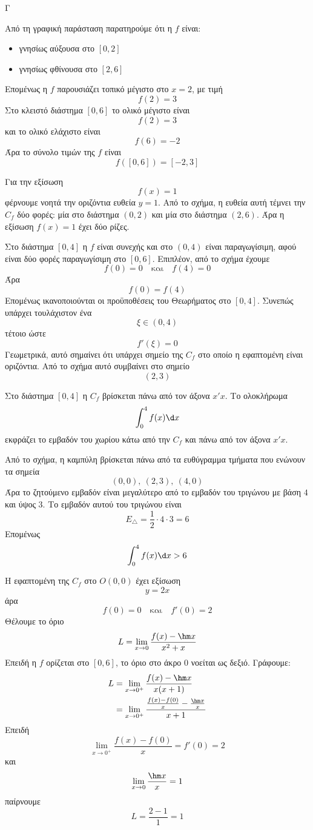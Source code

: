 \begin{thema}{Γ}
\begin{erwthma}
\item Από τη γραφική παράσταση παρατηρούμε ότι η $f$ είναι:
\begin{itemize}
\item γνησίως αύξουσα στο $[0,2]$
\item γνησίως φθίνουσα στο $[2,6]$
\end{itemize}
Επομένως η $f$ παρουσιάζει τοπικό μέγιστο στο $x=2$, με τιμή
\[
f(2)=3
\]
Στο κλειστό διάστημα $[0,6]$ το ολικό μέγιστο είναι
\[
f(2)=3
\]
και το ολικό ελάχιστο είναι
\[
f(6)=-2
\]
Άρα το σύνολο τιμών της $f$ είναι
\[
f([0,6])=[-2,3]
\]

Για την εξίσωση
\[
f(x)=1
\]
φέρνουμε νοητά την οριζόντια ευθεία $y=1$.
Από το σχήμα, η ευθεία αυτή τέμνει την $C_f$ δύο φορές: μία στο διάστημα $(0,2)$ και μία στο διάστημα $(2,6)$.
Άρα η εξίσωση $f(x)=1$ έχει δύο ρίζες.

\item Στο διάστημα $[0,4]$ η $f$ είναι συνεχής και στο $(0,4)$ είναι παραγωγίσιμη, αφού είναι δύο φορές παραγωγίσιμη στο $[0,6]$.
Επιπλέον, από το σχήμα έχουμε
\[
f(0)=0
\quad \text{και}\quad
f(4)=0
\]
Άρα
\[
f(0)=f(4)
\]
Επομένως ικανοποιούνται οι προϋποθέσεις του Θεωρήματος  στο $[0,4]$.
Συνεπώς υπάρχει τουλάχιστον ένα
\[
\xi\in(0,4)
\]
τέτοιο ώστε
\[
f'(\xi)=0
\]
Γεωμετρικά, αυτό σημαίνει ότι υπάρχει σημείο της $C_f$ στο οποίο η εφαπτομένη είναι οριζόντια.
Από το σχήμα αυτό συμβαίνει στο σημείο
\[
(2,3)
\]

\item Στο διάστημα $[0,4]$ η $C_f$ βρίσκεται πάνω από τον άξονα $x'x$.
Το ολοκλήρωμα
\[
\dint_0^4 f(x)\d x
\]
εκφράζει το εμβαδόν του χωρίου κάτω από την $C_f$ και πάνω από τον άξονα $x'x$.

Από το σχήμα, η καμπύλη βρίσκεται πάνω από τα ευθύγραμμα τμήματα που ενώνουν τα σημεία
\[
(0,0),\ (2,3),\ (4,0)
\]
Άρα το ζητούμενο εμβαδόν είναι μεγαλύτερο από το εμβαδόν του τριγώνου με βάση $4$ και ύψος $3$.
Το εμβαδόν αυτού του τριγώνου είναι
\[
E_{\triangle}=\frac{1}{2}\cdot 4\cdot 3=6
\]
Επομένως
\[
\dint_0^4 f(x)\d x>6
\]

\item Η εφαπτομένη της $C_f$ στο $O(0,0)$ έχει εξίσωση
\[
y=2x
\]
άρα
\[
f(0)=0
\quad \text{και}\quad
f'(0)=2
\]
Θέλουμε το όριο
\[
L=\lim\limits_{x\to 0}\frac{f(x)-\hm x}{x^2+x}
\]
Επειδή η $f$ ορίζεται στο $[0,6]$, το όριο στο άκρο $0$ νοείται ως δεξιό.
Γράφουμε:
\begin{align*}
L
&=\lim\limits_{x\to 0^+}\frac{f(x)-\hm x}{x(x+1)}\\
&=\lim\limits_{x\to 0^+}\frac{\frac{f(x)-f(0)}{x}-\frac{\hm x}{x}}{x+1}
\end{align*}
Επειδή
\[
\lim\limits_{x\to 0^+}\frac{f(x)-f(0)}{x}=f'(0)=2
\]
και
\[
\lim\limits_{x\to 0}\frac{\hm x}{x}=1
\]
παίρνουμε
\[
L=\frac{2-1}{1}=1
\]
\end{erwthma}
\end{thema}

